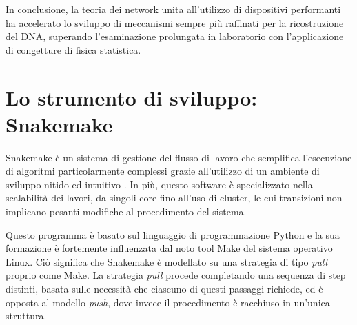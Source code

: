 In conclusione, la teoria dei network unita all'utilizzo di dispositivi performanti ha accelerato lo sviluppo di meccanismi sempre più raffinati per la ricostruzione del DNA, superando l'esaminazione prolungata in laboratorio con l'applicazione di congetture di fisica statistica.    

\section{Lo strumento di sviluppo: Snakemake}
\label{sec:SM}
Snakemake è un sistema di gestione del flusso di lavoro che semplifica l'esecuzione di algoritmi particolarmente complessi grazie all'utilizzo di un ambiente di sviluppo nitido ed intuitivo \cite{Koster2012}.
In più, questo software è specializzato nella scalabilità dei lavori, da singoli core fino all'uso di cluster, le cui transizioni non implicano pesanti modifiche al procedimento del sistema.

Questo programma è basato sul linguaggio di programmazione Python e la sua formazione è fortemente influenzata dal noto tool Make del sistema operativo Linux.
Ciò significa che Snakemake è modellato su una strategia di tipo \textit{pull} proprio come Make.
La strategia \textit{pull} procede completando una sequenza di step distinti, basata sulle necessità che ciascuno di questi passaggi richiede, ed è opposta al modello \textit{push}, dove invece il procedimento è racchiuso in un'unica struttura. 

